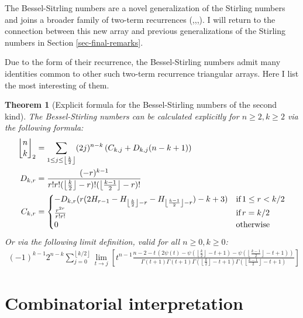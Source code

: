 \documentclass[a4paper]{amsart}
\newcommand{\mStirling}[0]{\genfrac{\lfloor}{\rfloor}{0pt}{}}
\newcommand{\floor}[1]{\left\lfloor #1 \right\rfloor}
\newtheorem{theorem}{Theorem}
\begin{document}
The Bessel-Sitrling numbers are a novel generalization of the Stirling numbers and joins a broader family of two-term recurrences (\cite{mansour_general_2012},\cite{neuwirth_recursively_2001},\cite{barbero_g_bivariate_2014},\cite{spiveySolutionsGeneralCombinatorial2011}). I will return to the connection between this new array and previous generalizations of the Stirling numbers in Section \ref{sec-final-remarks}.

Due to the form of their recurrence, the Bessel-Stirling numbers admit many identities common to other such two-term recurrence triangular arrays. Here I list the most interesting of them.
\begin{theorem}[Explicit formula for the Bessel-Stirling numbers of the second kind]
The Bessel-Stirling numbers can be calculated explicitly for $n \ge 2, k \geq 2$ via  the following formula:
\begin{equation*}\label{z-d-c}
    \begin{aligned}
        \mStirling{n}{k}_2&= \sum_{1 \leq j \leq \floor{\frac{k}{2}}}(2j)^{n-k}\left (C_{k,j} +D_{k,j}(n-k+1) \right )\\
            D_{k,r} &= \frac{(-r)^{k-1}}{r!r!(\floor{\frac{k}{2}}-r)!(\floor{\frac{k-1}{2}}-r)!} \\
            C_{k,r} &= \begin{cases}
                - D_{k,r} (r(2H_{r-1}-H_{\floor{\frac{k}{2}}-r}-H_{\floor{\frac{k-1}{2}}-r})-k+3) & \text{if} \, 1 \leq r < k/2\\
                \frac{r^{2r}}{r!r!} & \text{if}  \, r = k/2\\
                0 & \text{otherwise}
            \end{cases} 
    \end{aligned}
\end{equation*}
Or via the following limit definition, valid for all $n\ge0, k\ge 0$:
$$
\begin{aligned}
    (-1)^{k-1} 2^{n-k} \sum_{j=0}^{\floor{k/2}} \lim_{t \to j} \left[t^{n-1}
        \frac
            {n-2-t\,\left(2\psi(t)-\psi\left(\floor{\frac{k}{2}}-t+1\right)-\psi\left(\floor{\frac{k-1}{2}}-t+1\right)\right)}
            {\Gamma(t+1) \Gamma(t+1) \Gamma(\floor{\frac{k}{2}}-t+1) \Gamma(\floor{\frac{k-1}{2}}-t+1)}\right]
\end{aligned}
$$
\end{theorem}

\section{Combinatorial interpretation}\label{sec-combinatorial}
\end{document}
